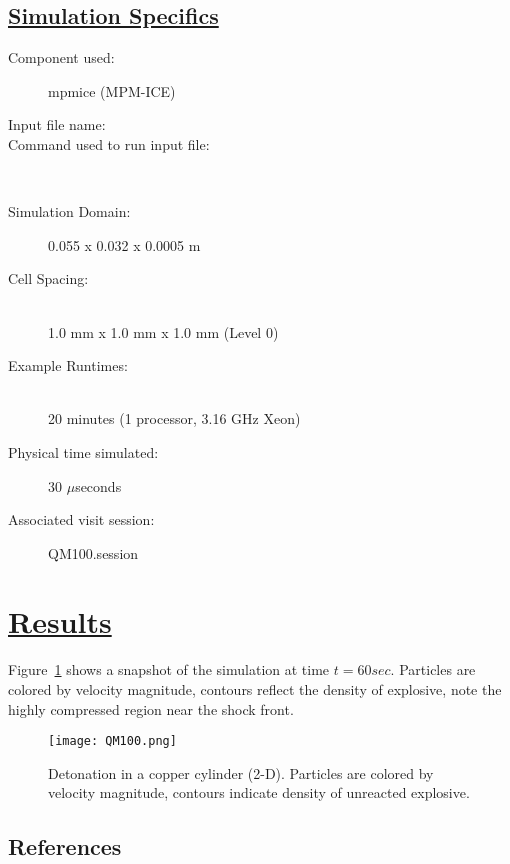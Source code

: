 \subsection*{\underline{Simulation Specifics}}
\begin{description}
\item [Component used:] \hfill mpmice (MPM-ICE)
\item [Input file name:] \hfill {}
\item [Command used to run input file:]\hfill \\

\item [Simulation Domain:]\hfill    0.055 x 0.032 x 0.0005 m

\item [Cell Spacing:]\hfill \\
1.0 mm x 1.0 mm x 1.0 mm (Level 0)

\item [Example Runtimes:] \hfill \\
 20 minutes   (1 processor, 3.16 GHz Xeon)\\

\item [Physical time simulated:] \hfill 30 $\mu$seconds

\item [Associated visit session:] \hfill QM100.session

\end{description}

\section*{\underline{Results}}

Figure~\ref{fig:QM100} shows a snapshot of the simulation at time $t=60sec$.
Particles are colored by velocity magnitude, contours reflect the density of
explosive, note the highly compressed region near the shock front.
\begin{figure}
  \center
  \texttt{[image: QM100.png]}
  \caption{Detonation in a copper cylinder (2-D).  Particles are colored by
           velocity magnitude, contours indicate density of unreacted
           explosive.}
  \label{fig:QM100}
\end{figure}
%
\newpage

%
\subsection{References}


